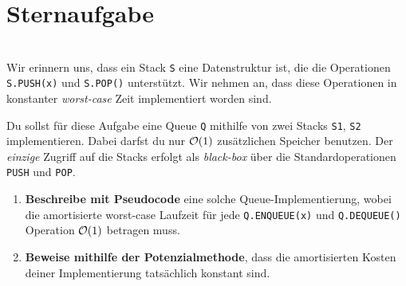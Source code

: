 \documentclass{uebung_cs}
\begin{document}
\section*{Sternaufgabe}

\begin{aufgabe}\mbox{}\\
	Wir erinnern uns, dass ein Stack \texttt{S} eine Datenstruktur ist, die die Operationen \texttt{S.PUSH(x)} und \texttt{S.POP()} unterstützt. Wir nehmen an, dass diese Operationen in konstanter \emph{worst-case} Zeit implementiert worden sind.

	Du sollst für diese Aufgabe eine Queue \texttt{Q} mithilfe von zwei Stacks \texttt{S1}, \texttt{S2} implementieren. Dabei darfst du nur $\mathcal{O}(1)$ zusätzlichen Speicher benutzen.
	Der \textit{einzige} Zugriff auf die Stacks erfolgt als \emph{black-box} über die Standardoperationen \texttt{PUSH} und \texttt{POP}.
	\begin{enumerate}
		\item 
		\textbf{Beschreibe mit Pseudocode} eine solche Queue-Implementierung, wobei die amortisierte worst-case Laufzeit für jede \texttt{Q.ENQUEUE(x)} und \texttt{Q.DEQUEUE()} Operation $\mathcal{O}(1)$ betragen muss.
		\item
		\textbf{Beweise mithilfe der Potenzialmethode}, dass die amortisierten Kosten deiner Implementierung tatsächlich konstant sind.
	\end{enumerate}
\end{aufgabe}
\end{document}
